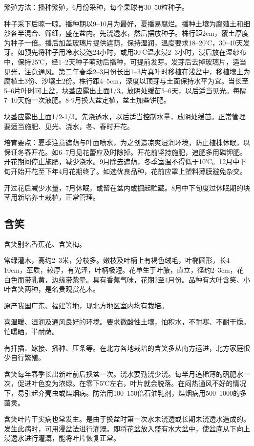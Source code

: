 \documentclass{ctexbook}
\begin{document}
繁殖方法：播种繁殖，6月份采种，每个果球有30--50粒种子。

种子采下后晾一晾。播种期以9--10月为最好，夏播易腐烂。播种土壤为腐殖土和细沙各半混合、筛细，盛在盆内。先浇透水，然后摆放种子。株行距2cm，覆土厚度为种子一倍。播后加盖玻璃片提供遮荫，保持湿润，温度要求18--20℃，30--40天发芽。如预先将种子用冷水浸泡24小时，或用30℃温水浸2--3小时，浸后放在湿纱布中，保持25℃，经1--2天种子萌动后播种，可提前发芽。发芽后去掉玻璃片，适当见光，注意通风。第二年春季2--3月份长出1--3片真叶时移植在浅盆中，移植壤土为腐植土3份、沙壤土2份。株行距4--5cm，深度以顶芽与土面保持水平为宜。当长至5--6片叶时可上盆，块茎应露出土面1/3。放阴处缓苗5--6天，以后适当见光。每隔7--10天施一次液肥。8-9月换大盆定植，盆土加些饼肥。

块茎应露出土面1/2-1/3。先浇透水，以后适当控制水量，放阴处缓苗。正常管理要适当施肥、见光、浇水，冬、春时开花。

培育要点：夏季注意遮荫与叶面喷水，为之创造凉爽湿润环境，防止植株休眠，以保证冬春开花。如6--7月见花蕾应及时除掉。开花前坚持施肥，追肥多用磷钾肥。开花期间停止施肥，减少浇水。9月除去遮荫，冬季室温不得低于10℃。12月中下旬开始开花至下年4月花期终了。如选优良品种，花前应罩上塑料薄膜避免杂交。

开过花后减少水量，7月休眠，或留在盆内或掘起贮藏。8月中下旬度过休眠期的块茎用新培养土栽植，正常管理。
\subsection{含笑}
含笑别名香蕉花、含笑梅。

常绿灌木，高约2--3米，分枝多。嫩枝及叶柄上有褐色绒毛，叶椭圆形，长4--10cm，革质，较厚，有光泽，叶柄极短。花单生于叶腋，直立，径约2--3cm，花白色而带乳黄，边缘带紫晕。具有香蕉气味，花期2至4月份。品种有大叶含笑、小叶含笑两种，是名贵观赏花木。

原产我国广东、福建等地，现北方地区室内均有栽培。

喜温暖、湿润及通风良好的环境。要求微酸性土壤，怕积水，不耐寒、不耐干燥。怕曝晒，半耐荫。

有扦插、嫁接、播种、压条等。在北方各地栽培的含笑多从南方运进，北方家庭很少自行繁殖。

含笑每年春季长出新叶前后换盆一次。浇水要勤浇少浇。每半月追稀薄的矾肥水一次，促进叶色变为浓绿。在零下5℃左右，叶片就会脱落。在闷热通风不好的情况下，易引起介壳虫或煤烟病。防治用100--150倍石油乳剂，煤烟病用500--1000的多菌灵。

含笑叶片干尖病也常发生。是由于换盆时第一次水未浇透或长期未浇透水造成的。发生此病时，可用浸盆法进行灌溉。即将花盆放入盛有水大盆中，使盆底从下向上浸透水进行灌溉，能将叶片恢复正常。
\end{document}
